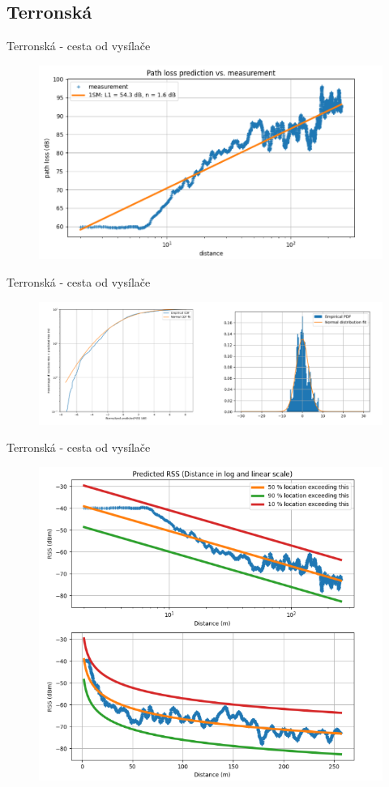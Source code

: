 \documentclass[aspectratio=169, 12pt, hyperref={unicode}]{beamer}
\begin{document}
\subsection{Terronská}
\begin{frame}{Terronská - cesta od vysílače}
	\begin{figure}[!ht]
		\centering
		\includegraphics[width=.75\textwidth]{src/terronska-od-vysilace-1.png}
	\end{figure}
\end{frame}
\begin{frame}{Terronská - cesta od vysílače}
	\begin{figure}[!ht]
		\centering
		\includegraphics[width=.95\textwidth]{src/terronska-od-vysilace-2.png}
	\end{figure}
\end{frame}
\begin{frame}{Terronská - cesta od vysílače}
	\begin{figure}[!ht]
		\centering
		\includegraphics[width=.5\textwidth]{src/terronska-od-vysilace-3.png}
	\end{figure}
\end{frame}
\end{document}
